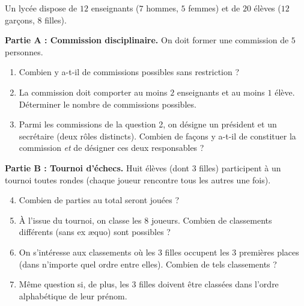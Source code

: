 \documentclass[11pt]{article}
\begin{document}
\begin{exercice}
Un lycée dispose de $12$ enseignants ($7$ hommes, $5$ femmes) et de $20$ élèves ($12$ garçons, $8$ filles).

\textbf{Partie A : Commission disciplinaire.} On doit former une commission de $5$ personnes.
\begin{enumerate}
    \item Combien y a-t-il de commissions possibles sans restriction ?
    \item La commission doit comporter au moins $2$ enseignants et au moins $1$ élève. Déterminer le nombre de commissions possibles.
    \item Parmi les commissions de la question 2, on désigne un président et un secrétaire (deux rôles distincts). Combien de façons y a-t-il de constituer la commission \textit{et} de désigner ces deux responsables ?
\end{enumerate}

\textbf{Partie B : Tournoi d'échecs.} Huit élèves (dont $3$ filles) participent à un tournoi toutes rondes (chaque joueur rencontre tous les autres une fois).
\begin{enumerate}\setcounter{enumi}{3}
    \item Combien de parties au total seront jouées ?
    \item À l'issue du tournoi, on classe les $8$ joueurs. Combien de classements différents (sans ex æquo) sont possibles ?
    \item On s'intéresse aux classements où les $3$ filles occupent les $3$ premières places (dans n'importe quel ordre entre elles). Combien de tels classements ?
    \item Même question si, de plus, les $3$ filles doivent être classées dans l'ordre alphabétique de leur prénom.
\end{enumerate}
\end{exercice}
\end{document}
